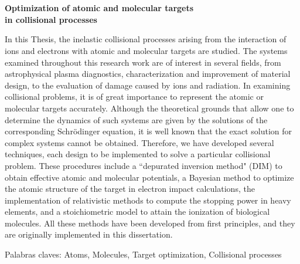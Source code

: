 \chapter*{}%
%

\begin{center}
\begin{large}
\textbf{Optimization of atomic and molecular targets \\ in collisional processes}
\end{large}
\end{center}

\vspace{1.5cm}
In this Thesis, the inelastic collisional processes arising from the interaction of ions and electrons with atomic and molecular targets are studied. The systems examined throughout this research work are of interest in several fields, from astrophysical plasma diagnostics, characterization and improvement of material design, to the evaluation of damage caused by ions and radiation. In examining collisional problems, it is of great importance to represent the atomic or molecular targets accurately. Although the theoretical grounds that allow one to determine the dynamics of such systems are given by the solutions of the corresponding Schrödinger equation, it is well known that the exact solution for complex systems cannot be obtained. Therefore, we have developed several techniques, each design to be implemented to solve a particular collisional problem. These procedures include a ``depurated inversion method" (DIM) to obtain effective atomic and molecular potentials, a Bayesian method to optimize the atomic structure of the target in electron impact calculations, the implementation of relativistic methods to compute the stopping power in heavy elements, and a stoichiometric model to attain the ionization of biological molecules. 
All these methods have been developed from first principles, and they are originally implemented in this dissertation. 

\vspace{1cm}
\noindent
Palabras claves: 
Atoms, 
Molecules,
Target optimization,
Collisional processes
